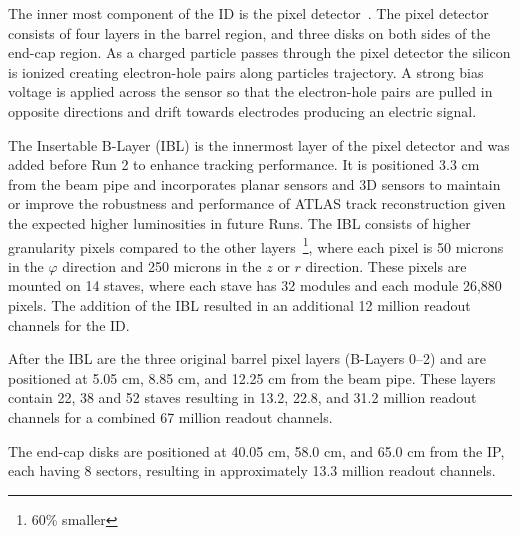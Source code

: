 The inner most component of the ID is the pixel detector~\cite{pixel_detector_2008, pixel_detector_ibl}. The pixel detector consists of four layers in the barrel region, and three disks on both sides of the end-cap region\@. As a charged particle passes through the pixel detector the silicon is ionized creating electron-hole pairs along particles trajectory. A strong bias voltage is applied across the sensor so that the electron-hole pairs are pulled in opposite directions and drift towards electrodes producing an electric signal. 

The Insertable B-Layer (IBL) is the innermost layer of the pixel detector and was added before Run 2 to enhance tracking performance. It is positioned 3.3 cm from the beam pipe and incorporates planar sensors and 3D sensors to maintain or improve the robustness and performance of ATLAS track reconstruction given the expected higher luminosities in future Runs. The IBL consists of higher granularity pixels compared to the other layers~\footnote{60\% smaller}, where each pixel is 50 microns in the $\varphi$ direction and 250 microns in the $z$ or $r$ direction. These pixels are mounted on 14 staves, where each stave has 32 modules and each module 26,880 pixels. The addition of the IBL resulted in an additional 12 million readout channels for the ID\@.

After the IBL are the three original barrel pixel layers (B-Layers 0--2) and are positioned at 5.05 cm, 8.85 cm, and 12.25 cm from the beam pipe. These layers contain 22, 38 and 52 staves resulting in 13.2, 22.8, and 31.2 million readout channels for a combined 67 million readout channels.

The end-cap disks are positioned at 40.05 cm, 58.0 cm, and 65.0 cm from the IP, each having 8 sectors, resulting in approximately 13.3 million readout channels.



